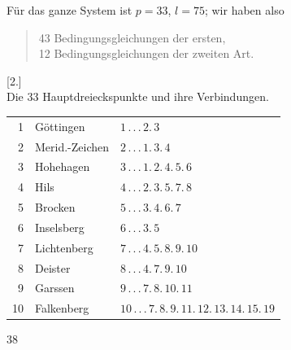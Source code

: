 Für das ganze System ist $p=33$, $l=75$; wir haben also
\begin{quote}
43 Bedingungsgleichungen der ersten,\\
12 Bedingungsgleichungen der zweiten Art.
\end{quote}
\begin{center}
[2.]\\[3pt]
Die 33 Hauptdreieckspunkte und ihre Verbindungen.
\end{center}
\noindent
\begin{tabular}{r|l|l}
1&Göttingen&$1\,.\,.\,.\,2.\,3$\\
2&Merid.-Zeichen&$2\,.\,.\,.\,1.\,3.\,4$\\
3&Hohehagen&$3\,.\,.\,.\,1.\,2.\,4.\,5.\,6$\\
4&Hils&$4\,.\,.\,.\,2.\,3.\,5.\,7.\,8$\\
5&Brocken&$5\,.\,.\,.\,3.\,4.\,6.\,7$\\
6&Inselsberg&$6\,.\,.\,.\,3.\,5$\\
7&Lichtenberg&$7\,.\,.\,.\,4.\,5.\,8.\,9.\,10$\\
8&Deister&$8\,.\,.\,.\,4.\,7.\,9.\,10$\\
9&Garssen&$9\,.\,.\,.\,7.\,8.\,10.\,11$\\
10&Falkenberg&$10\,.\,.\,.\,7.\,8.\,9.\,11.\,12.\,13.\,14.\,15.\,19$
\end{tabular}
\vfill
{}\hfill38

